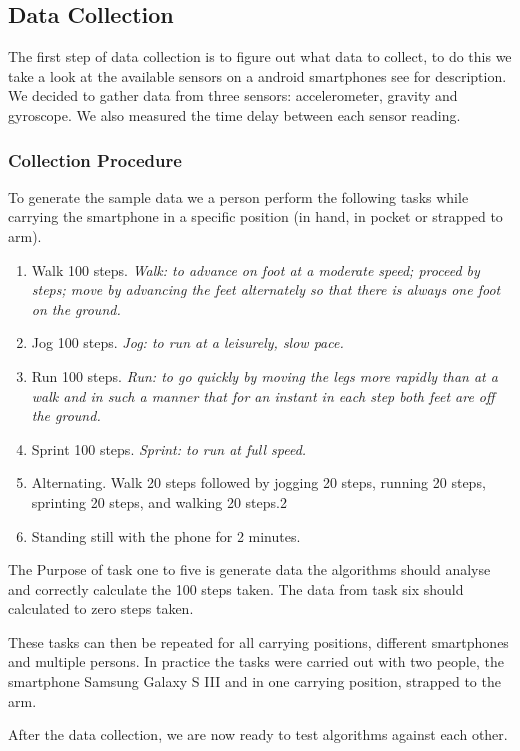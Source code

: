 \subsection{Data Collection}
The first step of data collection is to figure out what data to collect, to do this we take a look at the available sensors on a android smartphones see \citet{android:sensor} for description. We decided to gather data from three sensors: accelerometer, gravity and gyroscope. We also measured the time delay between each sensor reading.

\subsubsection{Collection Procedure}
To generate the sample data we a person perform the following tasks while carrying the smartphone in a specific position (in hand, in pocket or strapped to arm). 
\begin{enumerate}
\item Walk 100 steps. \textit{Walk: to advance on foot at a moderate speed; proceed by steps; move by advancing the feet alternately so that there is always one foot on the ground.} %
\item Jog 100 steps. \textit{Jog: to run at a leisurely, slow pace.} %
\item Run 100 steps. \textit{Run: to go quickly by moving the legs more rapidly than at a walk and in such a manner that for an instant in each step both feet are off the ground.} %
\item Sprint 100 steps. \textit{Sprint: to run at full speed.} %
\item Alternating. Walk 20 steps followed by jogging 20 steps, running 20 steps, sprinting 20 steps, and walking 20 steps.2
\item Standing still with the phone for 2 minutes.
\end{enumerate}

The Purpose of task one to five is generate data the algorithms should analyse and correctly calculate the 100 steps taken. The data from task six should calculated to zero steps taken.

These tasks can then be repeated for all carrying positions, different smartphones and multiple persons. In practice the tasks were carried out with two people, the smartphone Samsung Galaxy S III and in one carrying position, strapped to the arm.

After the data collection, we are now ready to test algorithms against each other.